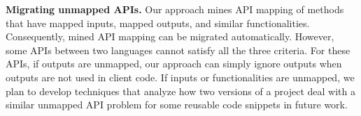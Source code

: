 \textbf{Migrating unmapped APIs.} Our approach mines API mapping of
methods that have mapped inputs, mapped outputs, and similar
functionalities. Consequently, mined API mapping can be migrated
automatically. However, some APIs between two languages cannot
satisfy all the three criteria. For these APIs, if outputs are
unmapped, our approach can simply ignore outputs when outputs are
not used in client code. If inputs or functionalities are unmapped,
we plan to develop techniques that analyze how two versions of a
project deal with a similar unmapped API problem for some reusable
code snippets in future work.
